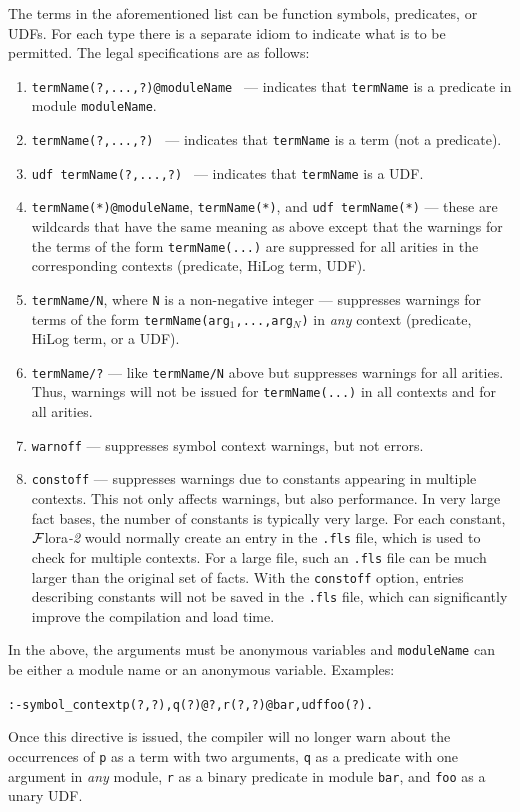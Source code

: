 \documentclass[11pt]{article}
\newcommand{\FLORA}{{\mbox{\sc ${\cal F}${lora}\rm\emph{-2}}}\xspace}
\begin{document}
The terms in the aforementioned list can be function symbols, predicates,
or UDFs. For each type there is a separate idiom to indicate what is to be
permitted.
The legal specifications are as follows:
\begin{enumerate}
\item {\tt termName(?,...,?)@moduleName } --- indicates that
  \texttt{termName} is a predicate in module \texttt{moduleName}.  
\item {\tt termName(?,...,?) } --- indicates that \texttt{termName} is a
  term (not a predicate).
\item {\tt udf termName(?,...,?) } --- indicates that \texttt{termName}
  is a UDF.
\item \texttt{termName(*)@moduleName}, \texttt{termName(*)}, and \texttt{udf
    termName(*)} --- these are wildcards that have the same meaning as
  above except that the warnings for the terms of the form
  \texttt{termName(...)}  are suppressed for all arities in the
  corresponding contexts (predicate, HiLog term, UDF).
\item \texttt{termName/N}, where \texttt{N} is a non-negative integer ---
  suppresses warnings for terms of the form
  \texttt{termName(arg$_1$,...,arg$_N$)} in \emph{any} context (predicate,
  HiLog term, or a UDF).
\item \texttt{termName/?} --- like \texttt{termName/N} above but suppresses
  warnings for all arities. Thus, warnings will not be issued for
  \texttt{termName(...)} in all contexts and for all arities.
\item \texttt{warnoff} --- suppresses symbol context warnings, but not errors.
\item \texttt{constoff} --- suppresses warnings due to constants appearing
  in multiple contexts. This not only affects warnings, but also performance.
  In very large fact bases, the number of constants is typically very large.
  For each constant, \FLORA would normally create an entry in the
  \texttt{.fls} file, which is used to check for multiple contexts.
  For a large file, such an \texttt{.fls} file can be much larger than the
  original set of facts. 
  With the \texttt{constoff} option, entries describing constants  will not be
  saved in the \texttt{.fls} file, which can significantly improve the
  compilation and load time. 
\end{enumerate}
In the above, the arguments must be anonymous variables
and \texttt{moduleName} can be either a module name or an anonymous variable.
Examples:
\begin{alltt}
    :- symbol_context p(?,?), q(?)@?, r(?,?)@bar, udf foo(?).
\end{alltt}
Once this directive is issued, the compiler will no longer warn about the
occurrences of \texttt{p} as a term with two arguments, \texttt{q} as a
predicate with one argument in \emph{any} module, \texttt{r} as a binary
predicate in module \texttt{bar}, and \texttt{foo} as a unary UDF.      
\end{document}
